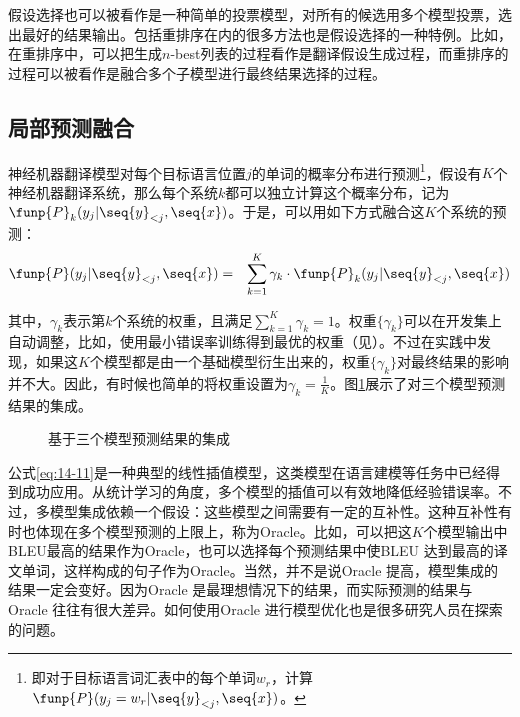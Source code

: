 \parinterval 假设选择也可以被看作是一种简单的投票模型，对所有的候选用多个模型投票，选出最好的结果输出。包括重排序在内的很多方法也是假设选择的一种特例。比如，在重排序中，可以把生成$n$-best列表的过程看作是翻译假设生成过程，而重排序的过程可以被看作是融合多个子模型进行最终结果选择的过程。


\subsection{局部预测融合}

\parinterval 神经机器翻译模型对每个目标语言位置$j$的单词的概率分布进行预测\footnote{即对于目标语言词汇表中的每个单词$w_r$，计算$\funp{P}(y_j=w_r | \seq{y}_{<j},\seq{x})$。}，假设有$K$个神经机器翻译系统，那么每个系统$k$都可以独立计算这个概率分布，记为$\funp{P}_{k} (y_j | \seq{y}_{<j},\seq{x})$。于是，可以用如下方式融合这$K$个系统的预测：
\begin{eqnarray}
\funp{P}(y_{j} | \seq{y}_{<j},\seq{x}) &=& \sum_{k=1}^K \gamma_{k} \cdot \funp{P}_{k} (y_j | \seq{y}_{<j},\seq{x})
\label{eq:14-11}
\end{eqnarray}

\noindent 其中，$\gamma_{k}$表示第$k$个系统的权重，且满足$\sum_{k=1}^{K} \gamma_{k} = 1$。权重$\{ \gamma_{k}\}$可以在开发集上自动调整，比如，使用最小错误率训练得到最优的权重（见\chapterseven）。不过在实践中发现，如果这$K$个模型都是由一个基础模型衍生出来的，权重$\{ \gamma_{k}\}$对最终结果的影响并不大。因此，有时候也简单的将权重设置为$\gamma_{k} = \frac{1}{K}$。图\ref{fig:14-9}展示了对三个模型预测结果的集成。

\begin{figure}[htp]
\centering

\caption{基于三个模型预测结果的集成}
\label{fig:14-9}
\end{figure}

\parinterval 公式\eqref{eq:14-11}是一种典型的线性插值模型，这类模型在语言建模等任务中已经得到成功应用。从统计学习的角度，多个模型的插值可以有效地降低经验错误率。不过，多模型集成依赖一个假设：这些模型之间需要有一定的互补性。这种互补性有时也体现在多个模型预测的上限上，称为Oracle。比如，可以把这$K$个模型输出中BLEU最高的结果作为Oracle，也可以选择每个预测结果中使BLEU 达到最高的译文单词，这样构成的句子作为Oracle。当然，并不是说Oracle 提高，模型集成的结果一定会变好。因为Oracle 是最理想情况下的结果，而实际预测的结果与Oracle 往往有很大差异。如何使用Oracle 进行模型优化也是很多研究人员在探索的问题。

